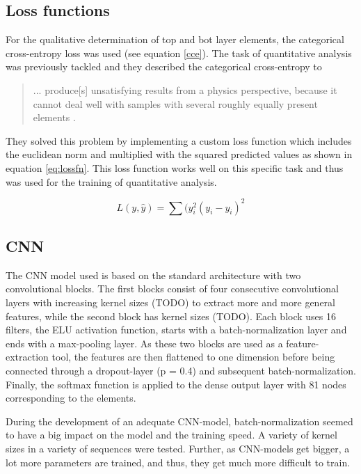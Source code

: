 \subsection{Loss functions}
For the qualitative determination of top and bot layer elements, the categorical cross-entropy loss was used (see equation \ref{cce}).
The task of quantitative analysis was previously tackled and they described the categorical cross-entropy to \begin{quote}
    ... produce[s] unsatisfying results from a physics perspective, because it cannot deal well
with samples with several roughly equally present elements \cite{drera_deep_2019}.
\end{quote}
They solved this problem by implementing a custom loss function which includes the euclidean norm and multiplied with the squared predicted values as shown in equation \ref{eq:lossfn}. This loss function works well on this specific task and thus was used for the training of quantitative analysis.

\begin{equation}
\label{eq:lossfn}
    L(y, \hat{y}) = \sum(y_{i}^2 (y_{i} - \hat{y_{i}})^2
\end{equation}




\subsection{CNN}
The CNN model used is based on the standard architecture with two convolutional blocks. The first blocks consist of four consecutive convolutional layers with increasing kernel sizes (TODO) to extract more and more general features, while the second block has kernel sizes (TODO). Each block uses 16 filters, the ELU activation function, starts with a batch-normalization layer and ends with a max-pooling layer.
As these two blocks are used as a feature-extraction tool, the features are then flattened to one dimension before being connected through a dropout-layer (p = 0.4) and subsequent batch-normalization. Finally, the softmax function is applied to the dense output layer with 81 nodes corresponding to the elements.

During the development of an adequate CNN-model, batch-normalization seemed to have a big impact on the model and the training speed. A variety of kernel sizes in a variety of sequences were tested. Further, as CNN-models get bigger, a lot more parameters are trained, and thus, they get much more difficult to train.

